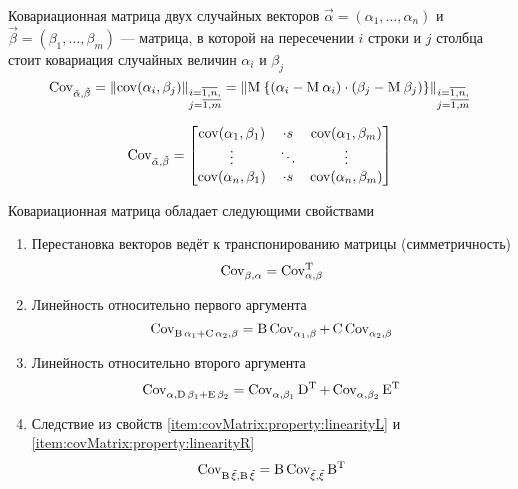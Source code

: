 \begin{definition}\label{def:covMatrix}
  Ковариационная матрица двух случайных векторов
  $\vec{\alpha} = \left( \alpha_1, \dots, \alpha_n \right)$ и
  $\vec{\beta} = \left( \beta_1, \dots, \beta_m \right)$ --- матрица,
  в которой на пересечении $i$ строки и $j$ столбца стоит ковариация случайных
  величин $\alpha_i$ и $\beta_j$
  $$\operatorname{Cov^{}_{\vec{\alpha}, \vec{\beta}}}
      = \left\| \operatorname{cov}\!\left( \alpha_i, \beta_j \right) \right\|_{
      \substack{i= \overline{1,n},\\j= \overline{1,m}}}
      = \left\| \operatorname{M}_{} 
      \left\{ \left( \alpha_i - \operatorname{M}_{} \alpha_i \right)
          \cdot \left( \beta_j - \operatorname{M}_{} \beta_j \right)
      \right\} \right\|_{
          \substack{i= \overline{1,n},\\j= \overline{1,m}}}$$

  $$\operatorname{Cov^{}_{\vec{\alpha}, \vec{\beta}}} =
  \begin{bmatrix}
      \operatorname{cov}\!\left( \alpha_1, \beta_1 \right) & \cdot s & \operatorname{cov}\!\left( \alpha_1, \beta_m \right) \\
      \vdots & \ddots & \vdots \\
      \operatorname{cov}\!\left( \alpha_n, \beta_1 \right) & \cdot s & \operatorname{cov}\!\left( \alpha_n, \beta_m \right)
  \end{bmatrix}$$
\end{definition}

Ковариационная матрица обладает следующими свойствами
\begin{enumerate}
  \item\label{item:covMatrix:property:transposition}
      Перестановка векторов ведёт к транспонированию матрицы (симметричность)
      $$\operatorname{Cov^{}_{\beta, \alpha}} = \operatorname{Cov^{T}_{\alpha, \beta}}$$
  \item\label{item:covMatrix:property:linearityL}
      Линейность относительно первого аргумента
      $$\operatorname{Cov^{}_{\operatorname{B} \alpha_1 + \operatorname{C} \alpha_2, \beta}}
      = \operatorname{B} \operatorname{Cov^{}_{\alpha_1, \beta}}
          + \operatorname{C}\operatorname{Cov^{}_{\alpha_2, \beta}}$$
  \item\label{item:covMatrix:property:linearityR}
      Линейность относительно второго аргумента
      $$\operatorname{Cov^{}_{\alpha, \operatorname{D} \beta_1 + \operatorname{E} \beta_2}}
      = \operatorname{Cov^{}_{\alpha, \beta_1}} \operatorname{D^T}
          + \operatorname{Cov^{}_{\alpha, \beta_2}} \operatorname{E^T}$$
  \item\label{item:covMatrix:property:operatorOut}
      Следствие из свойств \ref{item:covMatrix:property:linearityL} и
      \ref{item:covMatrix:property:linearityR}
      $$\operatorname{Cov^{}_{\operatorname{B} \vec{\xi}, \operatorname{B} \vec{\xi}}}
      = \operatorname{B} \operatorname{Cov^{}_{\vec{\xi}, \vec{\xi}}} \operatorname{B^T}$$
\end{enumerate}



